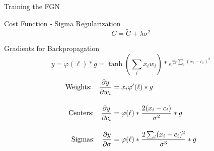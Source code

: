 \documentclass{beamer}
\begin{document}
\begin{frame}{Training the FGN}
    \begin{block}{Cost Function - Sigma Regularization}
    $$ C = \tilde{C} + \lambda\sigma^2  $$
    \end{block}
    
    \begin{block}{Gradients for Backpropagation}
    $$ y =  \varphi(\ell)*g = \tanh(\sum_i x_i w_i) * e^{\frac{-1}{\sigma^2}\sum_{i}(x_i-c_i)^2}$$
    \vspace{-0.6cm}
    \begin{align*}
        \text{Weights:\quad} \frac{\partial y}{\partial w_i} &=  x_i \varphi'(\ell) * g  \\[1em]
        \text{Centers:\quad} \frac{\partial y}{\partial c_i} &= \varphi(\ell) * \frac{2(x_i-c_i)}{\sigma^2} * g \\[1em]
        \text{Sigmas:\quad} \frac{\partial y}{\partial \sigma} &= \varphi(\ell) * \frac{2\sum_{i}(x_i-c_i)^2}{\sigma^3}* g
    \end{align*}
    \end{block}
    \end{frame}
    
\end{document}
